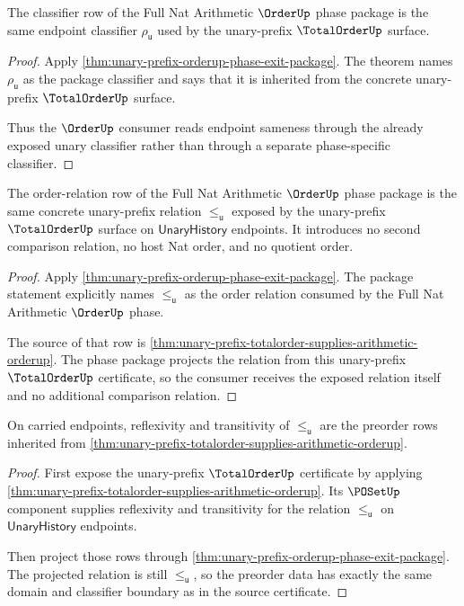 \begin{theorem}
\label{thm:unary-prefix-orderup-classifier-obligation}
The classifier row of the Full Nat Arithmetic $\OrderUp$ phase package is the
same endpoint classifier $\rho_{\mathsf{u}}$ used by the unary-prefix
$\TotalOrderUp$ surface.
\end{theorem}
\begin{proof}
Apply \autoref{thm:unary-prefix-orderup-phase-exit-package}. The theorem names
$\rho_{\mathsf{u}}$ as the package classifier and says that it is inherited from
the concrete unary-prefix $\TotalOrderUp$ surface.

Thus the $\OrderUp$ consumer reads endpoint sameness through the already exposed
unary classifier rather than through a separate phase-specific classifier.
\end{proof}

\begin{theorem}
\label{thm:unary-prefix-orderup-relation-obligation}
The order-relation row of the Full Nat Arithmetic $\OrderUp$ phase package is
the same concrete unary-prefix relation $\le_{\mathsf{u}}$ exposed by the
unary-prefix $\TotalOrderUp$ surface on $\mathsf{UnaryHistory}$ endpoints. It
introduces no second comparison relation, no host Nat order, and no quotient
order.
\end{theorem}
\begin{proof}
Apply \autoref{thm:unary-prefix-orderup-phase-exit-package}. The package
statement explicitly names $\le_{\mathsf{u}}$ as the order relation consumed by
the Full Nat Arithmetic $\OrderUp$ phase.

The source of that row is
\autoref{thm:unary-prefix-totalorder-supplies-arithmetic-orderup}. The phase
package projects the relation from this unary-prefix $\TotalOrderUp$
certificate, so the consumer receives the exposed relation itself and no
additional comparison relation.
\end{proof}

\begin{theorem}
\label{thm:unary-prefix-orderup-preorder-obligation}
On carried endpoints, reflexivity and transitivity of $\le_{\mathsf{u}}$ are
the preorder rows inherited from
\autoref{thm:unary-prefix-totalorder-supplies-arithmetic-orderup}.
\end{theorem}
\begin{proof}
First expose the unary-prefix $\TotalOrderUp$ certificate by applying
\autoref{thm:unary-prefix-totalorder-supplies-arithmetic-orderup}. Its
$\POSetUp$ component supplies reflexivity and transitivity for the relation
$\le_{\mathsf{u}}$ on $\mathsf{UnaryHistory}$ endpoints.

Then project those rows through
\autoref{thm:unary-prefix-orderup-phase-exit-package}. The projected relation
is still $\le_{\mathsf{u}}$, so the preorder data has exactly the same domain
and classifier boundary as in the source certificate.
\end{proof}

